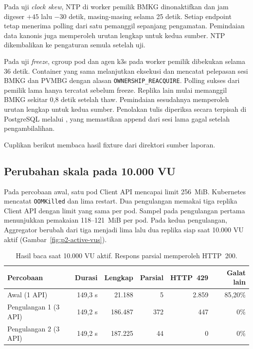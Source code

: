 
Pada uji \textit{clock skew}, NTP di worker pemilik BMKG dinonaktifkan dan jam digeser $+45$ lalu $-30$ detik, masing-masing selama 25 detik. Setiap endpoint tetap menerima polling dari satu pemanggil sepanjang pengamatan. Pemindaian data kanonis juga memperoleh urutan lengkap untuk kedua sumber. NTP dikembalikan ke pengaturan semula setelah uji.

Pada uji \textit{freeze}, cgroup pod dan agen k3s pada worker pemilik dibekukan selama 36 detik. Container yang sama melanjutkan eksekusi dan mencatat pelepasan sesi BMKG dan PVMBG dengan alasan \texttt{OWNERSHIP\_REACQUIRE}. Polling sukses dari pemilik lama hanya tercatat sebelum freeze. Replika lain mulai memanggil BMKG sekitar 0{,}8 detik setelah thaw. Pemindaian sesudahnya memperoleh urutan lengkap untuk kedua sumber. Penolakan tulis diperiksa secara terpisah di PostgreSQL melalui , yang memastikan append dari sesi lama gagal setelah pengambilalihan.

Cuplikan berikut membaca hasil fixture dari direktori sumber laporan.


\subsection{Perubahan skala pada 10.000 VU}

Pada percobaan awal, satu pod Client API mencapai limit 256~MiB. Kubernetes mencatat \texttt{OOMKilled} dan lima restart. Dua pengulangan memakai tiga replika Client API dengan limit yang sama per pod. Sampel pada pengulangan pertama menunjukkan pemakaian 118--121~MiB per pod. Pada kedua pengulangan, Aggregator berubah dari tiga menjadi lima lalu dua replika siap saat 10.000 VU aktif (Gambar~\ref{fig:p2-active-vus}).



\begin{table}[htbp]
\centering\small
\begin{tabularx}{\linewidth}{@{}Yrrrrr@{}}
\toprule
Percobaan & Durasi & Lengkap & Parsial & HTTP~429 & Galat lain \\
\midrule
Awal (1 API) & 149{,}3 s & 21.188 & 5 & 2.859 & 85{,}20\% \\
Pengulangan 1 (3 API) & 149{,}2 s & 186.487 & 372 & 447 & 0\% \\
Pengulangan 2 (3 API) & 149{,}2 s & 187.225 & 44 & 0 & 0\% \\
\bottomrule
\end{tabularx}
\caption{Hasil baca saat 10.000 VU aktif. Respons parsial memperoleh HTTP~200.}
\label{tab:p2-load}
\end{table}

